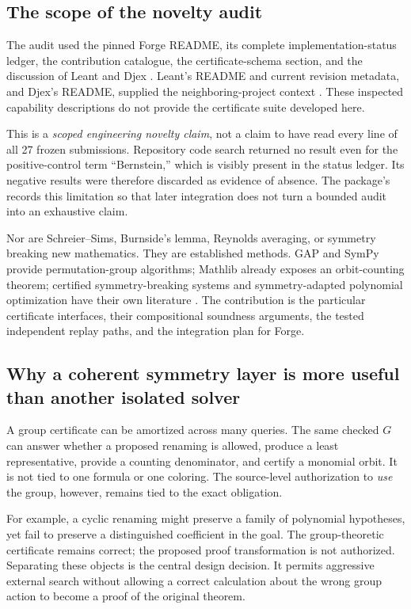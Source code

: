 \subsection{The scope of the novelty audit}
The audit used the pinned Forge README, its complete implementation-status ledger, the contribution catalogue, the certificate-schema section, and the discussion of Leant and Djex \cite{forge-readme,forge-status,forge-schemas,forge-neighbors}. Leant's README and current revision metadata, and Djex's README, supplied the neighboring-project context \cite{leant,djex}. These inspected capability descriptions do not provide the certificate suite developed here.

This is a \emph{scoped engineering novelty claim}, not a claim to have read every line of all 27 frozen submissions. Repository code search returned no result even for the positive-control term ``Bernstein,'' which is visibly present in the status ledger. Its negative results were therefore discarded as evidence of absence. The package's  records this limitation so that later integration does not turn a bounded audit into an exhaustive claim.

Nor are Schreier--Sims, Burnside's lemma, Reynolds averaging, or symmetry breaking new mathematics. They are established methods. GAP and SymPy provide permutation-group algorithms; Mathlib already exposes an orbit-counting theorem; certified symmetry-breaking systems and symmetry-adapted polynomial optimization have their own literature \cite{gap,sympy,mathlib-burnside,cert-symmetry,gatermann-parrilo}. The contribution is the particular certificate interfaces, their compositional soundness arguments, the tested independent replay paths, and the integration plan for Forge.

\subsection{Why a coherent symmetry layer is more useful than another isolated solver}
A group certificate can be amortized across many queries. The same checked $G$ can answer whether a proposed renaming is allowed, produce a least representative, provide a counting denominator, and certify a monomial orbit. It is not tied to one formula or one coloring. The source-level authorization to \emph{use} the group, however, remains tied to the exact obligation.

For example, a cyclic renaming might preserve a family of polynomial hypotheses, yet fail to preserve a distinguished coefficient in the goal. The group-theoretic certificate remains correct; the proposed proof transformation is not authorized. Separating these objects is the central design decision. It permits aggressive external search without allowing a correct calculation about the wrong group action to become a proof of the original theorem.

